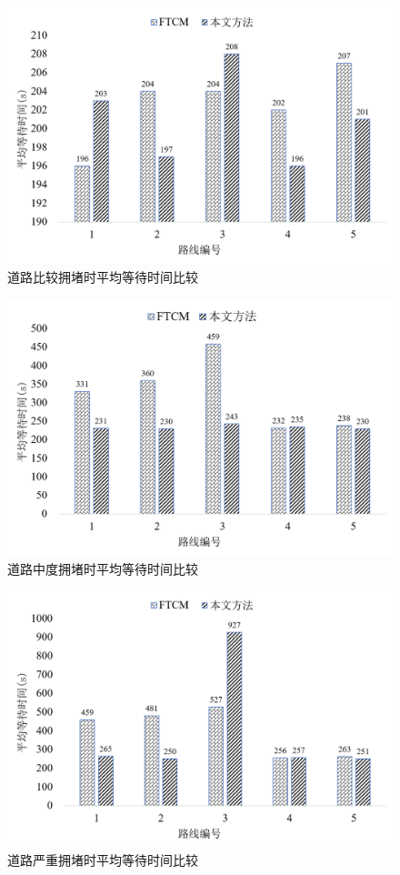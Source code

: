 \begin{figure}[H]
	\centering
	\includegraphics[width=\linewidth]{figures/awt2.png}
	\caption{道路比较拥堵时平均等待时间比较}
	\label{fig:waiting_relatively_congestion}
\end{figure}
\begin{figure}[H]
	\centering
	\includegraphics[width=\linewidth]{figures/awt3.png}
	\caption{道路中度拥堵时平均等待时间比较}
	\label{fig:waiting_moderate_congestion}
\end{figure}
\begin{figure}[H]
	\centering
	\includegraphics[width=\linewidth]{figures/awt4.png}
	\caption{道路严重拥堵时平均等待时间比较}
	\label{fig:waiting_severely_congestion}
\end{figure}

